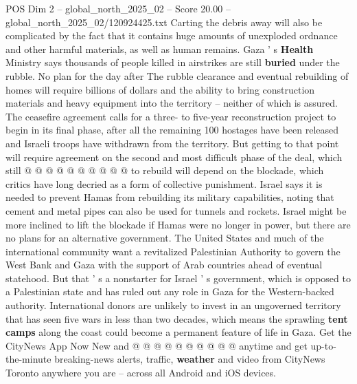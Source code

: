\begin{textsample}{POS Dim 2 – global\_north\_2025\_02 – Score 20.00 – global\_north\_2025\_02/120924425.txt}
Carting the debris away will also be complicated by the fact that it contains huge amounts of unexploded ordnance and other harmful materials, as well as human remains.
Gaza ' s \textbf{Health} Ministry says thousands of people killed in airstrikes are still \textbf{buried} under the rubble.
No plan for the day after The rubble clearance and eventual rebuilding of homes will require billions of dollars and the ability to bring construction materials and heavy equipment into the territory -- neither of which is assured.
The ceasefire agreement calls for a three- to five-year reconstruction project to begin in its final phase, after all the remaining 100 hostages have been released and Israeli troops have withdrawn from the territory.
But getting to that point will require agreement on the second and most difficult phase of the deal, which still @ @ @ @ @ @ @ @ @ @ to rebuild will depend on the blockade, which critics have long decried as a form of collective punishment.
Israel says it is needed to prevent Hamas from rebuilding its military capabilities, noting that cement and metal pipes can also be used for tunnels and rockets.
Israel might be more inclined to lift the blockade if Hamas were no longer in power, but there are no plans for an alternative government.
The United States and much of the international community want a revitalized Palestinian Authority to govern the West Bank and Gaza with the support of Arab countries ahead of eventual statehood.
But that ' s a nonstarter for Israel ' s government, which is opposed to a Palestinian state and has ruled out any role in Gaza for the Western-backed authority.
International donors are unlikely to invest in an ungoverned territory that has seen five wars in less than two decades, which means the sprawling \textbf{tent} \textbf{camps} along the coast could become a permanent feature of life in Gaza.
Get the CityNews App Now New and @ @ @ @ @ @ @ @ @ @ anytime and get up-to-the-minute breaking-news alerts, traffic, \textbf{weather} and video from CityNews Toronto anywhere you are -- across all Android and iOS devices.

\end{textsample}
